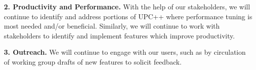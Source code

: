 \textbf{2. Productivity and Performance.}
With the help of our stakeholders, we will continue to identify and address
portions of UPC++ where performance tuning is most needed
and/or beneficial.  Similarly, we will continue to work with stakeholders to
identify and implement features which improve productivity.

\textbf{3. Outreach.}
We will continue to engage with our users, such as by circulation of working
group drafts of new features to solicit feedback.
